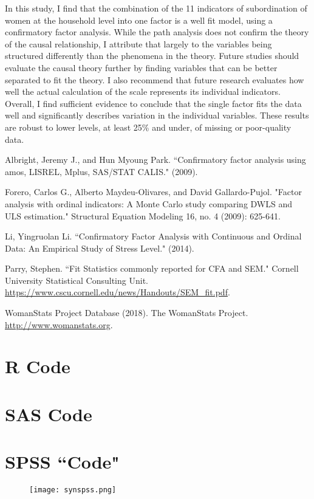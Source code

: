 \documentclass[letterpaper,11pt]{article}
\begin{document}
In this study, I find that the combination of the 11 indicators of subordination of women at the household level into one factor is a well fit model, using a confirmatory factor analysis. While the path analysis does not confirm the theory of the causal relationship, I attribute that largely to the variables being structured differently than the phenomena in the theory. Future studies should evaluate the causal theory further by finding variables that can be better separated to fit the theory. I also recommend that future research evaluates how well the actual calculation of the scale represents its individual indicators. Overall, I find sufficient evidence to conclude that the single factor fits the data well and significantly describes variation in the individual variables. These results are robust to lower levels, at least 25\% and under, of missing or poor-quality data. 

\begin{thebibliography}{99}

 Albright, Jeremy J., and Hun Myoung Park. ``Confirmatory factor analysis using amos, LISREL, Mplus, SAS/STAT CALIS." (2009).

 Forero, Carlos G., Alberto Maydeu-Olivares, and David Gallardo-Pujol. "Factor analysis with ordinal indicators: A Monte Carlo study comparing DWLS and ULS estimation." Structural Equation Modeling 16, no. 4 (2009): 625-641.

 Li, Yingruolan Li. ``Confirmatory Factor Analysis with Continuous and Ordinal Data: An Empirical Study of Stress Level." (2014).

Parry, Stephen. ``Fit Statistics commonly reported for CFA and SEM." Cornell University Statistical Consulting Unit. \url{https://www.cscu.cornell.edu/news/Handouts/SEM_fit.pdf}.

 WomanStats Project Database (2018). The WomanStats Project. \url{http://www.womanstats.org}.

\end{thebibliography}

\newpage
\appendix
\section{R Code}


\section{SAS Code}

\section{SPSS ``Code"}
\begin{figure}[H]
\centering
\texttt{[image: synspss.png]}
\end{figure}
\end{document}
